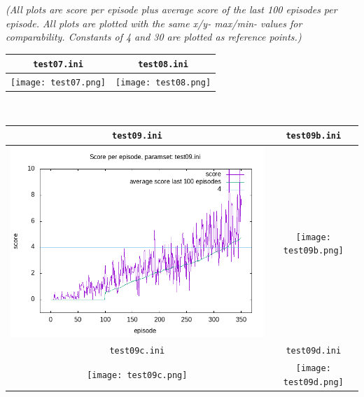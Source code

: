 \documentclass[a4paper]{article}
\begin{document}
\textit{(All plots are score per episode plus average score of the last 100 episodes per episode.
All plots are plotted with the same x/y- max/min- values
for comparability. Constants of 4 and 30 are plotted as reference points.)}
\\
\begin{tabular}{ |c|c| }
  \hline
  \texttt{test07.ini} & \texttt{test08.ini} \\
  \hline
  \texttt{[image: test07.png]} & \texttt{[image: test08.png]} \\
  \hline
\end{tabular}
\\
\begin{tabular}{ |c|c| }
  \hline
  \texttt{test09.ini} & \texttt{test09b.ini} \\
  \hline
  \includegraphics[scale=0.35]{test09.png} & \texttt{[image: test09b.png]} \\
  \hline
  \texttt{test09c.ini} & \texttt{test09d.ini} \\
  \hline
  \texttt{[image: test09c.png]} & \texttt{[image: test09d.png]} \\
  \hline
\end{tabular}
\end{document}

